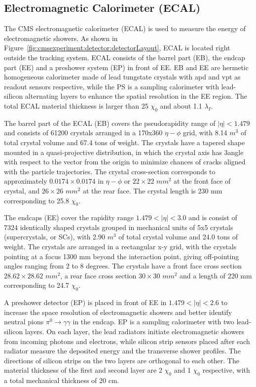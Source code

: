 \subsection{Electromagnetic Calorimeter (ECAL)}
The CMS electromagnetic calorimeter (ECAL) \cite{cms:ecalTdr:CMS:1997ysd} is used to measure the energy of electromagnetic showers. As shown in Figure~\ref{fig:cmsexperiment:detector:detectorLayout}, ECAL is located right outside the tracking system. ECAL consists of the barrel part (EB), the endcap part (EE) and a preshower system (EP) in front of EE. EB and EE are hermetic homogeneous calorimeter made of lead tungstate crystals with \acrfull{apd} and \acrfull{vpt} as readout sensors respective, while the PS is a sampling calorimeter with lead-silicon alternating layers to enhance the spatial resolution in the EE region. The total ECAL material thickness is larger than 25 $\chi_0$ and about 1.1 $\lambda_I$.

The barrel part of the ECAL (EB) covers the pseudorapidity range of $|\eta|< 1.479$ and consists of 61200 crystals arranged in a 170x360 $\eta - \phi$ grid, with 8.14 $m^3$ of total crystal volume and 67.4 tons of weight. The crystals have a tapered shape mounted in a quasi-projective distribution, in which the crystal axis has 3\degree angle with respect to the vector from the origin to minimize chances of cracks aligned with the particle trajectories. The crystal cross-section corresponds to approximately $0.0174 \times 0.0174$ in $\eta - \phi$ or $22 \times 22$ $mm^2$ at the front face of crystal, and $26\times26$ $mm^2$ at the rear face. The crystal length is 230 mm corresponding to 25.8 $\chi_0$.

The endcaps (EE) cover the rapidity range $1.479 < |\eta| < 3.0$ and is consist of 7324 identically shaped crystals grouped in mechanical units of 5x5 crystals (supercrystals, or SCs), with 2.90 $m^3$ of total crystal volume and 24.0 tons of weight. The crystals are arranged in a rectangular x-y grid, with the crystals pointing at a focus 1300 mm beyond the interaction point, giving off-pointing angles ranging from 2 to 8 degrees. The crystals have a front face cross section $28.62\times28.62$ $mm^2$, a rear face cross section $30\times30$ $mm^2$ and a length of 220 mm corresponding to 24.7 $\chi_0$.

A preshower detector (EP) is placed in front of EE in $1.479 < |\eta| < 2.6$ to increase the space resolution of electromagnetic showers and better identify neutral pions $\pi^0 \to \gamma \gamma$ in the endcap. EP is a sampling calorimeter with two lead-silicon layers. On each layer, the lead radiators initiate electromagnetic showers from incoming photons and electrons, while silicon strip sensors placed after each radiator measure the deposited energy and the transverse shower profiles. The directions of silicon strips on the two layers are orthogonal to each other. The material thickness of the first and second layer are 2 $\chi_0$ and 1 $\chi_0$ respective, with a total mechanical thickness of 20 cm.



